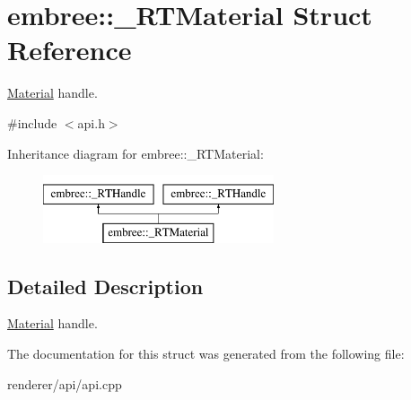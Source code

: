 \hypertarget{structembree_1_1___r_t_material}{
\section{embree::\_\-RTMaterial Struct Reference}
\label{structembree_1_1___r_t_material}
}


\hyperlink{classembree_1_1_material}{Material} handle.  




{\ttfamily \#include $<$api.h$>$}

Inheritance diagram for embree::\_\-RTMaterial:\begin{figure}[H]
\begin{center}
\leavevmode
\includegraphics[height=2.000000cm]{structembree_1_1___r_t_material}
\end{center}
\end{figure}


\subsection{Detailed Description}
\hyperlink{classembree_1_1_material}{Material} handle. 

The documentation for this struct was generated from the following file:\begin{DoxyCompactItemize}
\item 
renderer/api/api.cpp\end{DoxyCompactItemize}
